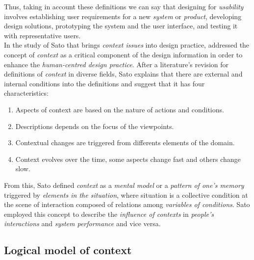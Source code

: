 Thus, taking in account these definitions we can say that designing for 
\textit{usability} involves establishing user requirements for a new
\textit{system} or \textit{product}, developing design solutions,
prototyping the system and the user interface, and testing it with
representative users.\\
In the study of Sato\cite{sato2004context} that brings \textit{context
issues} into design practice, addressed the concept of
\textit{context} as a critical component of the design information in
order to enhance the \textit{human-centred design practice}. After a
literature's revision for  definitions of \textit{context} in diverse
fields, Sato explains that there are external and internal conditions
into the definitions and suggest that it has four characteristics:
\begin{enumerate}  
\item Aspects of context are based on the nature of actions and 
conditions.
\item Descriptions depends on the focus of the viewpoints.
\item Contextual changes are triggered from differents elements 
of the domain. 
\item Context evolves over the time, some aspects change fast
and others change slow. 
\end{enumerate} 
From this, Sato defined \textit{context} as a \textit{mental model} or a
\textit{pattern of one's memory} triggered by \textit{elements in the
situation}, where situation is a collective condition at the scene of
interaction composed of relations among \textit{variables of
conditions}. Sato employed this concept to describe the
\textit{influence of contexts} in \textit{people's interactions} and
\textit{system performance} and vice versa.

\subsection{Logical model of context} 

